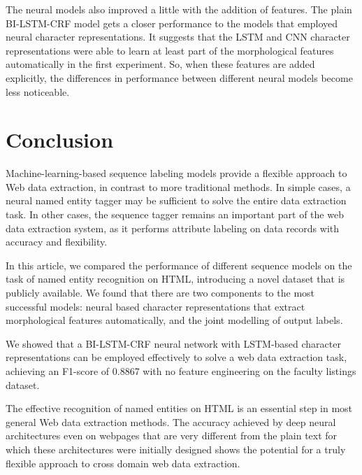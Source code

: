 \documentclass{nle}
\begin{document}
The neural models also improved a little with the addition of features. The plain BI-LSTM-CRF
model gets a closer performance to the models that employed neural character 
representations. It suggests that the LSTM and CNN character representations 
were able to learn at least part of the morphological features automatically in the
first experiment. So, when these features are added explicitly, the differences 
in performance between different neural models become less noticeable.

\section{Conclusion}

Machine-learning-based sequence labeling models provide a flexible approach to Web data 
extraction, in contrast to more traditional methods. In simple cases, a neural
named entity tagger may be sufficient to solve the entire data extraction task. In 
other cases, the sequence tagger remains an important part of the web data extraction
system, as it performs attribute labeling on data records with accuracy and flexibility.

In this article, we compared the performance of different sequence models on the task of
named entity recognition on HTML, introducing a novel dataset that is publicly available. 
We found that there are two components to the most successful models: neural based character 
representations that extract morphological features automatically, and the joint modelling 
of output labels.

We showed that a BI-LSTM-CRF neural network with LSTM-based character representations can 
be employed effectively to solve a web data extraction task, achieving an F1-score of 
0.8867 with no feature engineering on the faculty listings dataset.

The effective recognition of named entities on HTML is an essential step in most general 
Web data extraction methods. The accuracy achieved by deep neural architectures even
on webpages that are very different from the plain text for which these architectures 
were initially designed shows the potential for a truly flexible approach to cross domain 
web data extraction.

% 
% 
\end{document}
